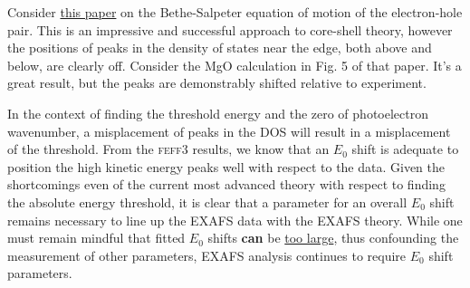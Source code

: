 \documentclass[11pt]{article}
\begin{document}
Consider \href{http://dx.doi.org/10.1103/PhysRevB.83.115106}{this
  paper} on the Bethe-Salpeter equation of motion of the electron-hole
pair.  This is an impressive and successful approach to core-shell
theory, however the positions of peaks in the density of states near
the edge, both above and below, are clearly off.  Consider the MgO
calculation in Fig. 5 of that paper.  It's a great result, but the
peaks are demonstrably shifted relative to experiment.

In the context of finding the threshold energy and the zero of
photoelectron wavenumber, a misplacement of peaks in the DOS will
result in a misplacement of the threshold.  From the \textsc{feff3}
results, we know that an $E_0$ shift is adequate to position the high
kinetic energy peaks well with respect to the data.  Given the
shortcomings even of the current most advanced theory with respect to
finding the absolute energy threshold, it is clear that a parameter
for an overall $E_0$ shift remains necessary to line up the EXAFS data
with the EXAFS theory.  While one must remain mindful that fitted $E_0$
shifts \textbf{can} be
\href{http://dx.doi.org/10.1107/S0909049598002970}{too large}, thus
confounding the measurement of other parameters, EXAFS analysis
continues to require $E_0$ shift parameters.
\end{document}
